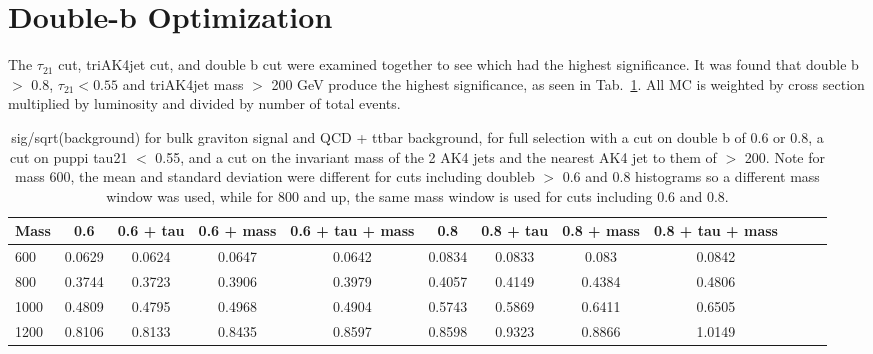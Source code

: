 \section{Double-b Optimization\label{app:doubleb}}

The $\tau_{21}$ cut, triAK4jet cut, and double b cut were examined together to see which had the highest significance. It was found that double b $>$ 0.8, $\tau_{21} < 0.55$ and triAK4jet mass $>$ 200 GeV produce the highest significance, as seen in Tab.~\ref{tab:doubleb}. All MC is weighted by cross section multiplied by luminosity and divided by number of total events.

\begin{table}[h]
\small
\begin{tabular}{|l|c|c|c|c|c|c|c|c|c|c|c|}
\hline
Mass & 0.6 & 0.6 + tau & 0.6 + mass & 0.6 + tau + mass & 0.8 & 0.8 + tau & 0.8 + mass & 0.8 + tau + mass \\ \hline
600 & 0.0629 & 0.0624 & 0.0647 & 0.0642 & 0.0834 & 0.0833 & 0.083 & 0.0842 \\
800 & 0.3744 & 0.3723 & 0.3906 & 0.3979 & 0.4057 & 0.4149 & 0.4384 & 0.4806 \\
1000 & 0.4809 & 0.4795 & 0.4968 & 0.4904 & 0.5743 & 0.5869 & 0.6411 & 0.6505\\
1200 & 0.8106 & 0.8133 & 0.8435 & 0.8597 & 0.8598 & 0.9323 & 0.8866 & 1.0149\\
\hline
\end{tabular}
\caption{sig/sqrt(background) for bulk graviton signal and QCD + ttbar background, for full selection with a cut on double b of 0.6 or 0.8, a cut on puppi tau21 $<$ 0.55, and a cut on the invariant mass of the 2 AK4 jets and the nearest AK4 jet to them of $>$ 200. Note for mass 600, the mean and standard deviation were different for cuts including doubleb $>$ 0.6  and 0.8 histograms so a different mass window was used, while for 800 and up, the same mass window is used for cuts including 0.6 and 0.8.}\label{tab:doubleb}
\end{table}
